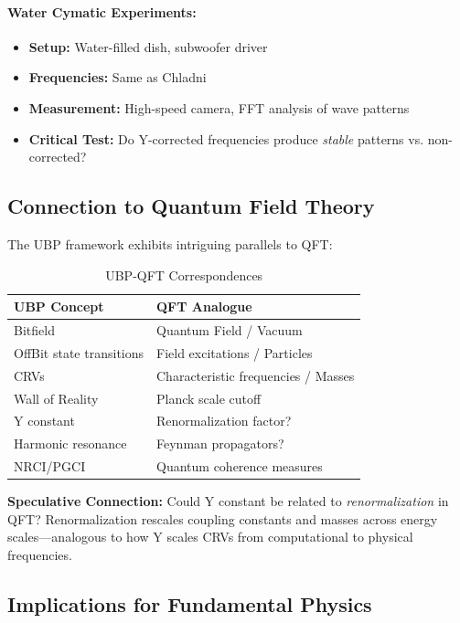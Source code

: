 \documentclass[11pt,a4paper]{article}
\begin{document}
\paragraph{Water Cymatic Experiments:}
\begin{itemize}
    \item \textbf{Setup:} Water-filled dish, subwoofer driver
    \item \textbf{Frequencies:} Same as Chladni
    \item \textbf{Measurement:} High-speed camera, FFT analysis of wave patterns
    \item \textbf{Critical Test:} Do Y-corrected frequencies produce \emph{stable} patterns vs. non-corrected?
\end{itemize}

\subsection{Connection to Quantum Field Theory}

The UBP framework exhibits intriguing parallels to QFT:

\begin{table}[H]
\centering
\caption{UBP-QFT Correspondences}
\begin{tabular}{@{}ll@{}}
\toprule
UBP Concept & QFT Analogue \\ \midrule
Bitfield & Quantum Field / Vacuum \\
OffBit state transitions & Field excitations / Particles \\
CRVs & Characteristic frequencies / Masses \\
Wall of Reality & Planck scale cutoff \\
Y constant & Renormalization factor? \\
Harmonic resonance & Feynman propagators? \\
NRCI/PGCI & Quantum coherence measures \\
\bottomrule
\end{tabular}
\end{table}

\textbf{Speculative Connection:} Could Y constant be related to \emph{renormalization} in QFT? Renormalization rescales coupling constants and masses across energy scales---analogous to how Y scales CRVs from computational to physical frequencies.

\subsection{Implications for Fundamental Physics}
\end{document}
